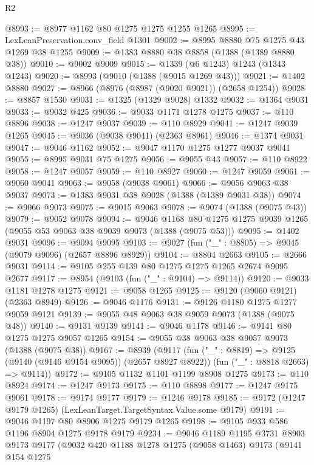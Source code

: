 \begin{lexlean}{R2}
\begin{coremodule}
@8993 := @8977 @1162 @80 @1275 @1275 @1255 @1265
@8995 := LexLeanPreservation.conv_field @1301
@9002 := @8995 @8880 @75 @1275 @43 @1269 @38 @1255
@9009 := @1383 @8880 @38 @8858 (@1388 (@1389 @8880 @38))
@9010 := @9002 @9009
@9015 := @1339 (@6 @1243) @1243 (@1343 @1243)
@9020 := @8993 (@9010 (@1388 (@9015 @1269 @43)))
@9021 := @1402 @8880
@9027 := @8966 (@8976 (@8987 (@9020 @9021)) (@2658 @1254))
@9028 := @8857 @1530
@9031 := @1325 (@1329 @9028) @1332
@9032 := @1364 @9031
@9033 := @9032 @425
@9036 := @9033 @1171 @1278 @1275
@9037 := @110 @8896
@9038 := @1247 @9037
@9039 := @110 @8929
@9041 := @1247 @9039 @1265
@9045 := @9036 (@9038 @9041) (@2363 @8961)
@9046 := @1374 @9031
@9047 := @9046 @1162
@9052 := @9047 @1170 @1275 @1277 @9037 @9041
@9055 := @8995 @9031 @75 @1275
@9056 := @9055 @43
@9057 := @110 @8922
@9058 := @1247 @9057
@9059 := @110 @8927
@9060 := @1247 @9059
@9061 := @9060 @9041
@9063 := @9058 (@9038 @9061)
@9066 := @9056 @9063 @38 @9037
@9073 := @1383 @9031 @38 @9028 (@1388 (@1389 @9031 @38))
@9074 := @9066 @9073
@9075 := @9015 @9063
@9078 := @9074 (@1388 (@9075 @43))
@9079 := @9052 @9078
@9094 := @9046
    @1168
    @80
    @1275
    @1275
    @9039
    @1265
    (@9055 @53 @9063 @38 @9039 @9073 (@1388 (@9075 @53)))
@9095 := @1402 @9031
@9096 := @9094 @9095
@9103 := @9027 (fun ("_" : @8805) => @9045 (@9079 @9096) (@2657 @8896 @8929))
@9104 := @8804 @2663
@9105 := @2666 @9031
@9114 := @9105 @255 @139 @80 @1275 @1275 @1265 @2674 @9095 @2677
@9117 := @8954 (@9103 (fun ("_" : @9104) => @9114))
@9120 := @9033 @1181 @1278 @1275
@9121 := @9058 @1265
@9125 := @9120 (@9060 @9121) (@2363 @8949)
@9126 := @9046 @1176
@9131 := @9126 @1180 @1275 @1277 @9059 @9121
@9139 := @9055 @48 @9063 @38 @9059 @9073 (@1388 (@9075 @48))
@9140 := @9131 @9139
@9141 := @9046 @1178
@9146 := @9141 @80 @1275 @1275 @9057 @1265
@9154 := @9055 @38 @9063 @38 @9057 @9073 (@1388 (@9075 @38))
@9167 := @8939
    (@9117
      (fun ("_" : @8819) => @9125 (@9140 (@9146 @9154 @9095)) (@2657 @8927 @8922))
      (fun ("_" : @8818 @2663) => @9114))
@9172 := @9105 @1132 @1101 @1199 @8908 @1275
@9173 := @110 @8924
@9174 := @1247 @9173
@9175 := @110 @8898
@9177 := @1247 @9175 @9061
@9178 := @9174 @9177
@9179 := @1246 @9178
@9185 := @9172 (@1247 @9179 @1265) (LexLeanTarget.TargetSyntax.Value.some @9179)
@9191 := @9046 @1197 @80 @8906 @1275 @9179 @1265
@9198 := @9105 @933 @586 @1196 @8904 @1275 @9178 @9179
@9234 := @9046
    @1189
    @1195
    @3731
    @8903
    @9173
    @9177
    (@9032
      @420
      @1188
      @1278
      @1275
      (@9058 @1463)
      @9173
      (@9141
        @154
        @1275

\end{coremodule}
\end{lexlean}
